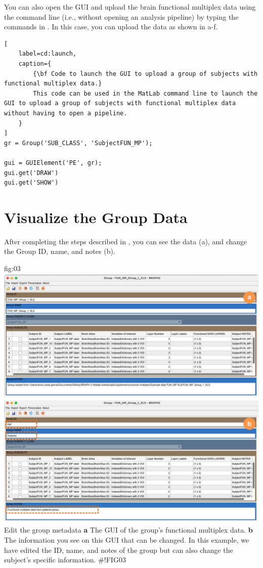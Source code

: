 \documentclass[justified]{tufte-handout}
\begin{document}
\begin{tcolorbox}[
	title=GUI launch from command line
]
You can also open the GUI and upload the brain functional multiplex data using the command line (i.e., without opening an analysis pipeline) by typing the commands in . In this case, you can upload the data as shown in a-f.
%
\begin{lstlisting}[
	label=cd:launch,
	caption={
		{\bf Code to launch the GUI to upload a group of subjects with functional multiplex data.}
		This code can be used in the MatLab command line to launch the GUI to upload a group of subjects with functional multiplex data without having to open a pipeline.
	}
]
gr = Group('SUB_CLASS', 'SubjectFUN_MP');

gui = GUIElement('PE', gr);
gui.get('DRAW')
gui.get('SHOW')
\end{lstlisting}
\end{tcolorbox}

\section{Visualize the Group Data}

After completing the steps described in , you can see the data (a), and change the Group ID, name, and notes (b). 

	{fig:03}
	{
	\includegraphics{fig03.jpg}
	}
	{Edit the group metadata}
	{ 
	{\bf a} The GUI of the group's functional multiplex data. 
	{\bf b} The information you see on this GUI that can be changed. In this example, we have edited the ID, name, and notes of the group but can also change the subject's specific information.
	}
#!FIG03
\end{document}
